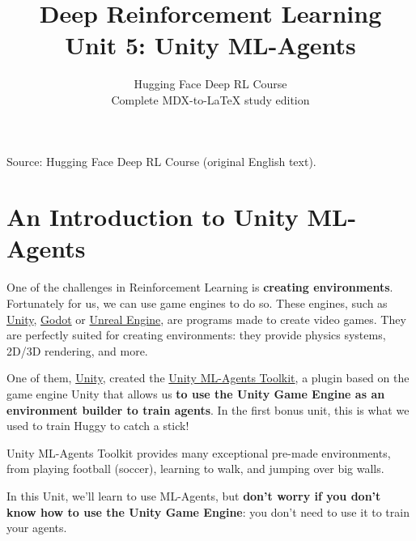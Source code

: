 \documentclass[11pt,a4paper]{article}
\title{\textbf{Deep Reinforcement Learning}\\[0.35em]\large Unit 5: Unity ML-Agents}
\author{Hugging Face Deep RL Course\\\small Complete MDX-to-\LaTeX{} study edition}
\date{}
\begin{document}
\maketitle
\vspace{-0.8em}
\begin{center}\small\color{secondary}Source: Hugging Face Deep RL Course (original English text).\end{center}
\begingroup\small\setlength{\parskip}{0pt}\tableofcontents\endgroup
\vspace{0.5em}
\clearpage

\section{An Introduction to Unity ML-Agents}\label{an-introduction-to-unity-ml-agents}


One of the challenges in Reinforcement Learning is \textbf{creating environments}. Fortunately for us, we can use game engines to do so. These engines, such as \href{https://unity.com/}{Unity}, \href{https://godotengine.org/}{Godot} or \href{https://www.unrealengine.com/}{Unreal Engine}, are programs made to create video games. They are perfectly suited for creating environments: they provide physics systems, 2D/3D rendering, and more.

One of them, \href{https://unity.com/}{Unity}, created the \href{https://github.com/Unity-Technologies/ml-agents}{Unity ML-Agents Toolkit}, a plugin based on the game engine Unity that allows us \textbf{to use the Unity Game Engine as an environment builder to train agents}. In the first bonus unit, this is what we used to train Huggy to catch a stick!


Unity ML-Agents Toolkit provides many exceptional pre-made environments, from playing football (soccer), learning to walk, and jumping over big walls.

In this Unit, we'll learn to use ML-Agents, but \textbf{don't worry if you don't know how to use the Unity Game Engine}: you don't need to use it to train your agents.
\end{document}
